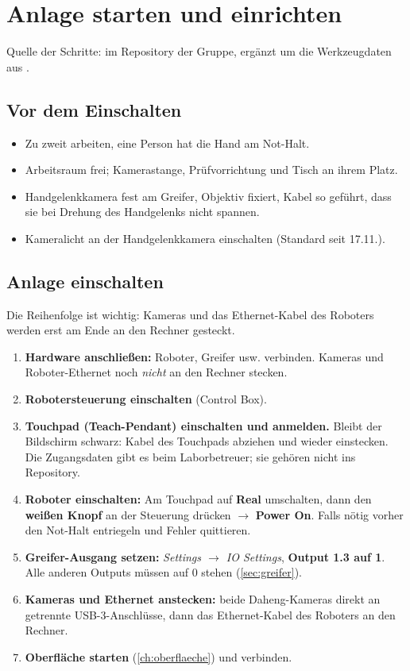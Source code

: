 \chapter{Anlage starten und einrichten}
\label{ch:anlage}

Quelle der Schritte:  im Repository der Gruppe, ergänzt um die
Werkzeugdaten aus .

\section{Vor dem Einschalten}

\begin{itemize}
  \item Zu zweit arbeiten, eine Person hat die Hand am Not-Halt.
  \item Arbeitsraum frei; Kamerastange, Prüfvorrichtung und Tisch an ihrem Platz.
  \item Handgelenkkamera fest am Greifer, Objektiv fixiert, Kabel so geführt, dass sie bei
    Drehung des Handgelenks nicht spannen.
  \item Kameralicht an der Handgelenkkamera einschalten (Standard seit 17.11.).
\end{itemize}

\section{Anlage einschalten}
\label{sec:einschalten}

Die Reihenfolge ist wichtig: Kameras und das Ethernet-Kabel des Roboters werden erst am Ende
an den Rechner gesteckt.

\begin{enumerate}
  \item \textbf{Hardware anschließen:} Roboter, Greifer usw. verbinden. Kameras und
    Roboter-Ethernet noch \emph{nicht} an den Rechner stecken.
  \item \textbf{Robotersteuerung einschalten} (Control Box).
  \item \textbf{Touchpad (Teach-Pendant) einschalten und anmelden.} Bleibt der Bildschirm
    schwarz: Kabel des Touchpads abziehen und wieder einstecken. Die Zugangsdaten gibt es beim
    Laborbetreuer; sie gehören nicht ins Repository.
  \item \textbf{Roboter einschalten:} Am Touchpad auf \textbf{Real} umschalten, dann den
    \textbf{weißen Knopf} an der Steuerung drücken $\rightarrow$ \textbf{Power On}. Falls nötig
    vorher den Not-Halt entriegeln und Fehler quittieren.
  \item \textbf{Greifer-Ausgang setzen:} \emph{Settings $\rightarrow$ IO Settings},
    \textbf{Output 1.3 auf 1}. Alle anderen Outputs müssen auf 0 stehen
    (\cref{sec:greifer}).
  \item \textbf{Kameras und Ethernet anstecken:} beide Daheng-Kameras direkt an getrennte
    USB-3-Anschlüsse, dann das Ethernet-Kabel des Roboters an den Rechner.
  \item \textbf{Oberfläche starten} (\cref{ch:oberflaeche}) und verbinden.
\end{enumerate}

